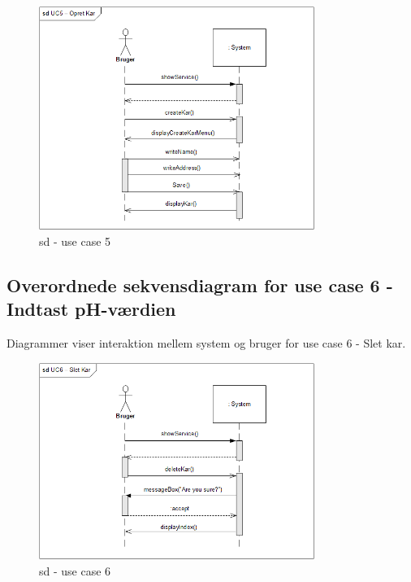 \begin{figure}[H]
    \centering
    \includegraphics[width=0.8\textwidth]{Systemarkitektur/OverordnedeSekvensdiagrammer/sd_UC5.PNG}
    \caption{sd - use case 5}
    \label{fig:sd_UC5}
\end{figure}

\subsection{Overordnede sekvensdiagram for use case 6 - Indtast pH-værdien}
Diagrammer viser interaktion mellem system og bruger for use case 6 - Slet kar.

\begin{figure}[H]
    \centering
    \includegraphics[width=0.8\textwidth]{Systemarkitektur/OverordnedeSekvensdiagrammer/sd_UC6.PNG}
    \caption{sd - use case 6}
    \label{fig:sd_UC6}
\end{figure}